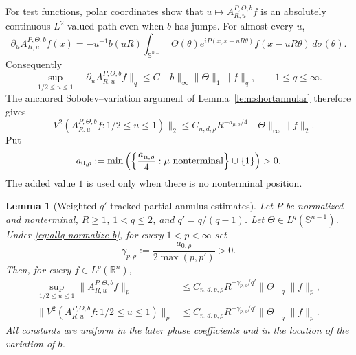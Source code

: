 \documentclass[11pt]{article}
\numberwithin{equation}{section}
\newtheorem{lemma}[theorem]{Lemma}
\theoremstyle{remark}
\theoremstyle{definition}
\newcommand{\R}{\mathbb R}
\newcommand{\Sph}{\mathbb S}
\begin{document}
For test functions, polar coordinates show that
$u\mapsto A^{P,\Theta,b}_{R,u}f$ is an absolutely continuous
$L^2$-valued path even when $b$ has jumps.  For almost every $u$,
\[
 \partial_uA^{P,\Theta,b}_{R,u}f(x)
 =-u^{-1}b(uR)\int_{\Sph^{n-1}}\Theta(\theta)
 e^{iP(x,x-uR\theta)}f(x-uR\theta)\,d\sigma(\theta).
\]
Consequently
\[
 \sup_{1/2\le u\le1}
 \|\partial_uA^{P,\Theta,b}_{R,u}f\|_q
 \le C\|b\|_\infty\|\Theta\|_1\|f\|_q,
 \qquad1\le q\le\infty.
\]
The anchored Sobolev--variation argument of
Lemma~\ref{lem:shortannular} therefore gives
\begin{equation}\label{eq:allq-short-annular-decay}
 \|V^2(A^{P,\Theta,b}_{R,u}f:1/2\le u\le1)\|_2
 \le C_{n,d,\rho}R^{-a_{\mu,\rho}/4}
 \|\Theta\|_\infty\|f\|_2.
\end{equation}
Put
\begin{equation}\label{eq:allq-global-annular-exponent}
 a_{0,\rho}
 :=\min\left(\left\{\frac{a_{\mu,\rho}}4:
                 \mu\ {\rm nonterminal}\right\}\cup\{1\}\right)>0.
\end{equation}
The added value $1$ is used only when there is no nonterminal position.

\begin{lemma}[Weighted $q'$-tracked partial-annulus estimates]
\label{lem:allq-qtracked-annulus}
Let $P$ be normalized and nonterminal, $R\ge1$, $1<q\le2$, and
$q'=q/(q-1)$.  Let $\Theta\in L^q(\Sph^{n-1})$.  Under
\eqref{eq:allq-normalize-b}, for every $1<p<\infty$ set
\[
 \gamma_{p,\rho}:=\frac{a_{0,\rho}}{2\max(p,p')}>0.
\]
Then, for every $f\in L^p(\R^n)$,
\begin{align}
 \sup_{1/2\le u\le1}
 \|A^{P,\Theta,b}_{R,u}f\|_p
 &\le C_{n,d,p,\rho}R^{-\gamma_{p,\rho}/q'}
       \|\Theta\|_q\|f\|_p,
 \label{eq:allq-qtracked-annulus}\\
 \|V^2(A^{P,\Theta,b}_{R,u}f:1/2\le u\le1)\|_p
 &\le C_{n,d,p,\rho}R^{-\gamma_{p,\rho}/q'}
       \|\Theta\|_q\|f\|_p.
 \label{eq:allq-qtracked-short}
\end{align}
All constants are uniform in the later phase coefficients and in the
location of the variation of $b$.
\end{lemma}
\end{document}
